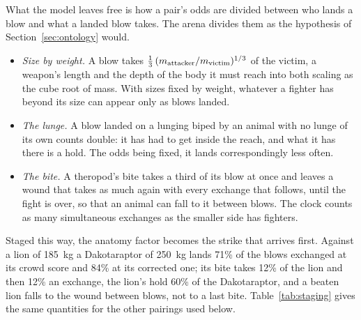 \documentclass[11pt]{article}
\begin{document}
What the model leaves free is how a pair's odds are divided between who lands a blow and what a landed blow takes. The arena divides them as the hypothesis of Section~\ref{sec:ontology} would.
\begin{itemize}
\item \emph{Size by weight.} A blow takes $\tfrac13\,(m_{\rm attacker}/m_{\rm victim})^{1/3}$ of the victim, a weapon's length and the depth of the body it must reach into both scaling as the cube root of mass. With sizes fixed by weight, whatever a fighter has beyond its size can appear only as blows landed.
\item \emph{The lunge.} A blow landed on a lunging biped by an animal with no lunge of its own counts double: it has had to get inside the reach, and what it has there is a hold. The odds being fixed, it lands correspondingly less often.
\item \emph{The bite.} A theropod's bite takes a third of its blow at once and leaves a wound that takes as much again with every exchange that follows, until the fight is over, so that an animal can fall to it between blows. The clock counts as many simultaneous exchanges as the smaller side has fighters.
\end{itemize}
Staged this way, the anatomy factor becomes the strike that arrives first. Against a lion of 185~kg a Dakotaraptor of 250~kg lands 71\% of the blows exchanged at its crowd score and 84\% at its corrected one; its bite takes 12\% of the lion and then 12\% an exchange, the lion's hold 60\% of the Dakotaraptor, and a beaten lion falls to the wound between blows, not to a last bite. Table~\ref{tab:staging} gives the same quantities for the other pairings used below.
\end{document}
